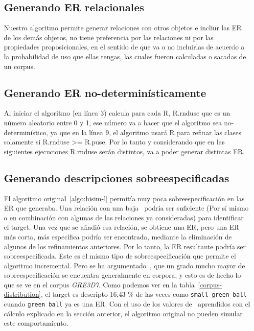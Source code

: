 \subsection{Generando ER relacionales}

Nuestro algoritmo permite generar relaciones con otros objetos e incliur las ER de los dem\'as objetos, no tiene preferencia por las relaciones ni por las propiedades proposicionales, en el sentido de que va o no incluirlas de acuerdo a la probabilidad de uso que ellas tengas, las cuales fueron calculadas o sacadas de un corpus.

\subsection{Generando ER no-determin\'isticamente}

Al iniciar el algoritmo (en l\'inea 3) calcula para cada R, R.rnduse que es un n\'umero aleatorio entre 0 y 1, ese n\'umero va a hacer que el algoritmo sea no-determin\'istico, ya que en la l\'inea 9, el algoritmo usar\'a R para refinar las clases solamente si 
R.rnduse >= R.puse. Por lo tanto y considerando que en las siguientes ejecuciones R.rnduse ser\'an distintos, va a poder generar distintas ER.

\subsection{Generando descripciones sobreespecificadas}\label{sec:overspecification}


El algoritmo original~\ref{algo:bisim-l}
 permit\'ia muy poca sobreespecificaci\'on en las ER que
generaba. Una relaci\'on con una baja \puse\ podr\'{i}a ser suficiente
(Por s\'{i} mismo o en combinaci\'on con algunas de las relaciones ya consideradas) para
identificar el target. Una vez que se a\~nadi\'o esa relaci\'on, se obtiene una ER, pero una ER m\'as corta, m\'as espec\'{i}fica podr\'{i}a ser encontrada, mediante la eliminaci\'on de algunos de los refinamientos anteriores.
Por lo tanto, la ER resultante podr\'{i}a ser sobreespecificada. Este es el mismo tipo de sobreespecificaci\'on
que permite el algoritmo incremental. Pero se ha argumentado~\cite{Engelhardt_Bailey_Ferreira_2006}, \cite{Arts_Maes_Noordman_Jansen_2011} que
un grado mucho mayor de sobreespecificaci\'on se encuentra generalmente en corpora, y esto
es de hecho lo que se ve en el corpus \textit{GRE3D7}. Como podemos ver en la tabla~\ref{corpus-distribution},
el target es descripto 16,43 \% de las veces como \texttt{small green ball} cuando \texttt{green ball} ya es una ER. Con el uso de los valores de \puse\ aprendidos con el c\'alculo explicado en la secci\'on anterior, el algoritmo original no pueden simular este comportamiento.

